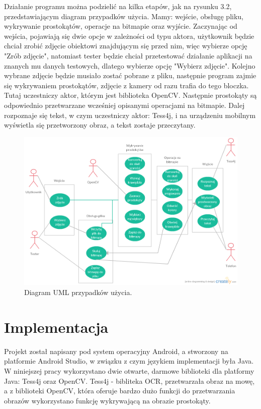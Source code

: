 \documentclass[eng,oneside]{mgr}
\begin{document}
\par Działanie programu można podzielić na kilka etapów, jak na rysunku 3.2, przedstawiającym diagram przypadków użycia. Mamy: wejście, obsługę pliku, wykrywanie prostokątów, operacje na bitmapie oraz wyjście. Zaczynając od wejścia, pojawiają się dwie opcje w zależności od typu aktora, użytkownik będzie chciał zrobić zdjęcie obiektowi znajdującym się przed nim, więc wybierze opcję "Zrób zdjęcie", natomiast tester będzie chciał przetestować działanie aplikacji na znanych mu danych testowych, dlatego wybierze opcję "Wybierz zdjęcie". Kolejno wybrane zdjęcie będzie musiało zostać pobrane z pliku, następnie program zajmie się wykrywaniem prostokątów, zdjęcie z kamery od razu trafia do tego bloczka. Tutaj uczestniczy aktor, którym jest biblioteka OpenCV. Następnie prostokąty są odpowiednio przetwarzane wcześniej opisanymi operacjami na bitmapie. Dalej rozpoznaje się tekst, w czym uczestniczy aktor: Tess4j, i na urządzeniu mobilnym wyświetla się przetworzony obraz, a tekst zostaje przeczytany.
\begin{figure}[htbp]
\centering
\includegraphics[scale=0.5]{usecasediagram.png}
\caption{Diagram UML przypadków użycia.}
\end{figure}
\chapter{Implementacja}
Projekt został napisany pod system operacyjny Android, a stworzony na platformie Android Studio, w związku z czym językiem implementacji była Java. W niniejszej pracy wykorzystano dwie otwarte, darmowe biblioteki dla platformy Java: Tess4j oraz OpenCV. Tess4j - bibliteka OCR, przetwarzała obraz na mowę, a z biblioteki OpenCV, która oferuje bardzo dużo funkcji do przetwarzania obrazów wykorzystano funkcję wykrywającą na obrazie prostokąty. 
\end{document}
